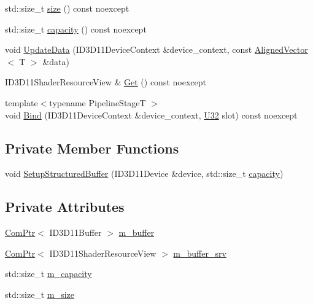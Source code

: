 \begin{DoxyCompactItemize}
\item 
std\+::size\+\_\+t \mbox{\hyperlink{classmage_1_1rendering_1_1_structured_buffer_ad12dc6e0dd105f21dcf1d31433aa6a4a}{size}} () const noexcept
\item 
std\+::size\+\_\+t \mbox{\hyperlink{classmage_1_1rendering_1_1_structured_buffer_a3ae2af55804a94eefa6b697d6eec1998}{capacity}} () const noexcept
\item 
void \mbox{\hyperlink{classmage_1_1rendering_1_1_structured_buffer_af08d78a68111bc28890eb10610db8a73}{Update\+Data}} (I\+D3\+D11\+Device\+Context \&device\+\_\+context, const \mbox{\hyperlink{namespacemage_a8664bfb5ce2179fc64eae9f82c8a5ba8}{Aligned\+Vector}}$<$ T $>$ \&data)
\item 
I\+D3\+D11\+Shader\+Resource\+View \& \mbox{\hyperlink{classmage_1_1rendering_1_1_structured_buffer_af7e538ca119896eb776d0da6b18029ea}{Get}} () const noexcept
\item 
{\footnotesize template$<$typename Pipeline\+StageT $>$ }\\void \mbox{\hyperlink{classmage_1_1rendering_1_1_structured_buffer_aeef55c61fc5331b08c3ae2cba8f8de64}{Bind}} (I\+D3\+D11\+Device\+Context \&device\+\_\+context, \mbox{\hyperlink{namespacemage_aa5d6eaabaac3cdd01873d6a3d27e90f3}{U32}} slot) const noexcept
\end{DoxyCompactItemize}
\subsection*{Private Member Functions}
\begin{DoxyCompactItemize}
\item 
void \mbox{\hyperlink{classmage_1_1rendering_1_1_structured_buffer_af21ae30edd673946d224dac2b6149632}{Setup\+Structured\+Buffer}} (I\+D3\+D11\+Device \&device, std\+::size\+\_\+t \mbox{\hyperlink{classmage_1_1rendering_1_1_structured_buffer_a3ae2af55804a94eefa6b697d6eec1998}{capacity}})
\end{DoxyCompactItemize}
\subsection*{Private Attributes}
\begin{DoxyCompactItemize}
\item 
\mbox{\hyperlink{namespacemage_ae74f374780900893caa5555d1031fd79}{Com\+Ptr}}$<$ I\+D3\+D11\+Buffer $>$ \mbox{\hyperlink{classmage_1_1rendering_1_1_structured_buffer_a57a60148175840b9dbf8001c6f290994}{m\+\_\+buffer}}
\item 
\mbox{\hyperlink{namespacemage_ae74f374780900893caa5555d1031fd79}{Com\+Ptr}}$<$ I\+D3\+D11\+Shader\+Resource\+View $>$ \mbox{\hyperlink{classmage_1_1rendering_1_1_structured_buffer_a2dd3ced6cf7b58de6b76d8175a07ec68}{m\+\_\+buffer\+\_\+srv}}
\item 
std\+::size\+\_\+t \mbox{\hyperlink{classmage_1_1rendering_1_1_structured_buffer_a44064eaf1bb494f976d6210fa60101ca}{m\+\_\+capacity}}
\item 
std\+::size\+\_\+t \mbox{\hyperlink{classmage_1_1rendering_1_1_structured_buffer_a036d38610a6d260f0401a12652bb6dac}{m\+\_\+size}}
\end{DoxyCompactItemize}


